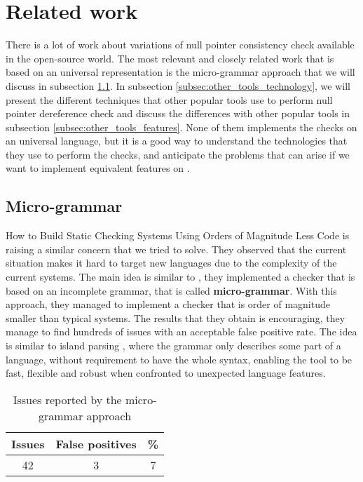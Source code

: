 \section{Related work}
\label{sec:related_work}

There is a lot of work about variations of null pointer consistency check available in the open-source world.
The most relevant and closely related work that is based on an universal representation is the micro-grammar approach \cite{Brown:2016:BSC:2954679.2872364} that we will discuss in subsection \ref{subsec:micro_grammar}.
In subsection \ref{subsec:other_tools_technology}, we will present the different techniques that other popular tools use to perform null pointer dereference check and discuss the differences with other popular tools in subsection \ref{subsec:other_tools_features}.
None of them implements the checks on an universal language, but it is a good way to understand the technologies that they use to perform the checks, and anticipate the problems that can arise if we want to implement equivalent features on \slang{}.

\subsection{Micro-grammar}
\label{subsec:micro_grammar}

How to Build Static Checking Systems Using Orders of Magnitude Less Code \cite{Brown:2016:BSC:2954679.2872364} is raising a similar concern that we tried to solve. 
They observed that the current situation makes it hard to target new languages due to the complexity of the current systems. 
The main idea is similar to \slang{}, they implemented a checker that is based on an incomplete grammar, that is called \textbf{micro-grammar}.
With this approach, they managed to implement a checker that is order of magnitude smaller than typical systems.
The results that they obtain is encouraging, they manage to find hundreds of issues with an acceptable false positive rate. 
The idea is similar to island parsing \cite{Moonen:2001}, where the grammar only describes some part of a language, without requirement to have the whole syntax, enabling the tool to be fast, flexible and robust when confronted to unexpected language features.

\begin{table}[h]
	\centering
	\caption{Issues reported by the micro-grammar approach}
	\label{table:micro_grammar_issues}
	\begin{tabular}{|c|c|c|}
		\hline
		\bf Issues & \bf False positives & \bf \% \\ \hline
		42 &  3 &  7 \\ \hline
	\end{tabular}
\end{table}

